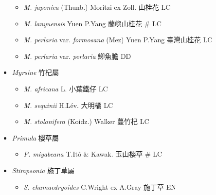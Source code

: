 \begin{itemize}
  \begin{itemize}
        \item[] \textit{M. japonica} (Thunb.) Moritzi ex Zoll.  山桂花   LC
        \item[] \textit{M. lanyuensis} Yuen P.Yang  蘭嶼山桂花  \# LC
        \item[] \textit{M. perlaria} var. \textit{formosana} (Mez) Yuen P.Yang  臺灣山桂花   LC
        \item[] \textit{M. perlaria} var. \textit{perlaria}   鯽魚膽   DD
  \end{itemize}
 \item[] \textit{Myrsine} 竹杞屬
                                
  \begin{itemize}
        \item[] \textit{M. africana} L.  小葉鐵仔   LC
        \item[] \textit{M. sequinii} H.Lév.  大明橘   LC
        \item[] \textit{M. stolonifera} (Koidz.) Walker  蔓竹杞   LC
  \end{itemize}
 \item[] \textit{Primula} 櫻草屬
                                
  \begin{itemize}
        \item[] \textit{P. miyabeana} T.Itô \& Kawak.  玉山櫻草  \# LC
  \end{itemize}
 \item[] \textit{Stimpsonia} 施丁草屬
                                
  \begin{itemize}
        \item[] \textit{S. chamaedryoides} C.Wright ex A.Gray  施丁草   EN
  \end{itemize}
  \end{itemize}
